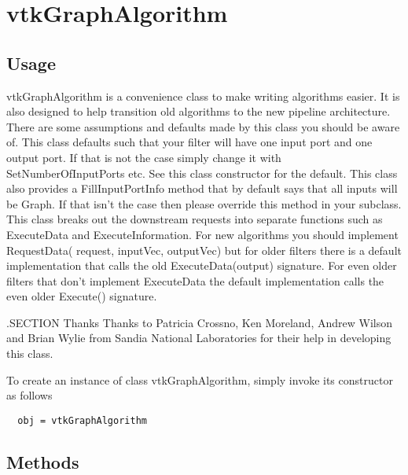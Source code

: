 \section{vtkGraphAlgorithm}

\subsection{Usage}

 vtkGraphAlgorithm is a convenience class to make writing algorithms
 easier. It is also designed to help transition old algorithms to the new
 pipeline architecture. There are some assumptions and defaults made by this
 class you should be aware of. This class defaults such that your filter
 will have one input port and one output port. If that is not the case
 simply change it with SetNumberOfInputPorts etc. See this class
 constructor for the default. This class also provides a FillInputPortInfo
 method that by default says that all inputs will be Graph. If that
 isn't the case then please override this method in your subclass. This
 class breaks out the downstream requests into separate functions such as
 ExecuteData and ExecuteInformation.  For new algorithms you should
 implement RequestData( request, inputVec, outputVec) but for older filters
 there is a default implementation that calls the old ExecuteData(output)
 signature. For even older filters that don't implement ExecuteData the
 default implementation calls the even older Execute() signature.

 .SECTION Thanks
 Thanks to Patricia Crossno, Ken Moreland, Andrew Wilson and Brian Wylie from
 Sandia National Laboratories for their help in developing this class.

To create an instance of class vtkGraphAlgorithm, simply
invoke its constructor as follows
\begin{verbatim}
  obj = vtkGraphAlgorithm
\end{verbatim}
\subsection{Methods}

